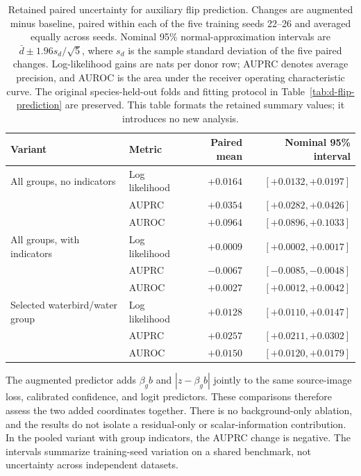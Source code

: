 \begin{table}[htbp]
\centering\small
\setlength{\tabcolsep}{5pt}
\caption{Retained paired uncertainty for auxiliary flip prediction.
Changes are augmented minus baseline, paired within each of the five training
seeds 22--26 and averaged equally across seeds. Nominal 95\% normal-approximation
intervals are $\bar d\pm1.96s_d/\sqrt5$, where $s_d$ is the sample standard
deviation of the five paired changes. Log-likelihood gains are nats per donor
row; AUPRC denotes average precision, and AUROC is the area under the receiver operating characteristic curve. The original species-held-out folds and
fitting protocol in Table~\ref{tab:d-flip-prediction} are preserved. This table
formats the retained summary values; it introduces no new analysis.}
\label{tab:supplement-flip-intervals}
\begin{tabular}{@{}>{\raggedright\arraybackslash}p{.32\linewidth}lrr@{}}
\toprule
Variant & Metric & Paired mean & Nominal 95\% interval \\
\midrule
All groups, no indicators & Log likelihood & $+0.0164$ & $[+0.0132,+0.0197]$ \\
 & AUPRC & $+0.0354$ & $[+0.0282,+0.0426]$ \\
 & AUROC & $+0.0964$ & $[+0.0896,+0.1033]$ \\
\addlinespace
All groups, with indicators & Log likelihood & $+0.0009$ & $[+0.0002,+0.0017]$ \\
 & AUPRC & $-0.0067$ & $[-0.0085,-0.0048]$ \\
 & AUROC & $+0.0027$ & $[+0.0012,+0.0042]$ \\
\addlinespace
Selected waterbird/water group & Log likelihood & $+0.0128$ & $[+0.0110,+0.0147]$ \\
 & AUPRC & $+0.0257$ & $[+0.0211,+0.0302]$ \\
 & AUROC & $+0.0150$ & $[+0.0120,+0.0179]$ \\
\bottomrule
\end{tabular}
\end{table}

The augmented predictor adds $\beta_gb$ and $|z-\beta_gb|$ jointly to the same
source-image loss, calibrated confidence, and logit predictors. These comparisons
therefore assess the two added coordinates together. There is no background-only
ablation, and the results do not isolate a residual-only or scalar-information
contribution. In the pooled variant with group indicators, the AUPRC change is
negative. The intervals summarize training-seed variation on a shared benchmark,
not uncertainty across independent datasets.
